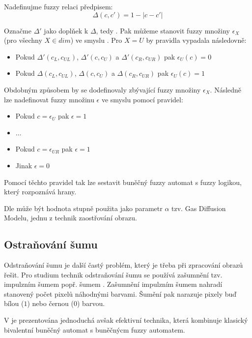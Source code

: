 \documentclass[a4paper,10pt]{article}
\begin{document}
Nadefinujme fuzzy relaci  předpisem:
$$
  \Delta(c, c') = 1 - | c - c' |
$$

Označme $\Delta'$ jako doplňek k $\Delta$, tedy . Pak můžeme stanovit fuzzy množiny $\epsilon_X$ (pro všechny $X \in dim$) ve smyslu . Pro $X = U$ by pravidla vypadala následovně:
\begin{itemize}
 \item Pokud $\Delta'(c_{L}, c_{UL})$, $\Delta'(c, c_{U})$ a $\Delta'(c_{R}, c_{UR})$ pak $\epsilon_U(c) = 0$
 \item Pokud $\Delta (c_{L}, c_{UL})$, $\Delta (c, c_{U})$ a $\Delta (c_{R}, c_{UR})$ pak $\epsilon_U(c) = 1$
\end{itemize}

Obdobným způsobem by se dodefinovaly zbývající fuzzy množiny $\epsilon_X$. Následně lze nadefinovat fuzzy množinu $\epsilon$ ve smyslu  pomocí pravidel:
\begin{itemize}
 \item Pokud $c = \epsilon_{U}$ pak $\epsilon = 1$
 \item $\dots$
 \item Pokud $c = \epsilon_{UR}$ pak $\epsilon = 1$
 \item Jinak $\epsilon = 0$
\end{itemize}

Pomocí těchto pravidel tak lze sestavit buněčný fuzzy automat s fuzzy logikou, který rozpoznává hrany. 

Dle \cite{MarMeySol-HybMetGasDifModFuzCelAutImSha} může být hodnota stupně  použita jako parametr $\alpha$ tzv. Gas Diffusion Modelu, jednu z technik zaostřování obrazu.

\subsection{Ostraňování šumu}
Odstraňování šumu je další častý problém, který je třeba při zpracování obrazů řešit. Pro studium technik odstraňování šumu se používá zašumnění tzv. impulzním šumem popř. šumem . Zašumnění impulzním šumem nahradí stanovený počet pixelů náhodnými barvami. Šumění  pak narazuje pixely buď bílou ($1$) nebo černou ($0$) barvou.

V \cite{SadRetKam-EfMetImpNoiRedImFuzCelAut} je prezentována jednoduchá avšak efektivní technika, která kombinuje klasický bivalentní buněčný automat s buněčnýcm fuzzy automatem. 
\end{document}
